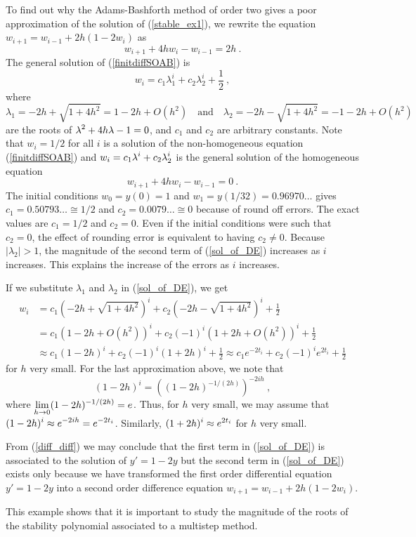 \begin{egg}
To find out why the Adams-Bashforth method of order two gives a poor
approximation of the solution of (\ref{stable_ex1}), we
rewrite the equation $w_{i+1} = w_{i-1} + 2h(1-2w_i)$ as
\begin{equation}\label{finitdiffSOAB}
  w_{i+1} + 4hw_i -w_{i-1} = 2h \ .
\end{equation}
The general solution of (\ref{finitdiffSOAB}) is
\begin{equation} \label{sol_of_DE}
w_i = c_1\lambda_1^i + c_2\lambda_2^i + \frac{1}{2} \ ,
\end{equation}
where
\[
\lambda_1 =-2h+\sqrt{1+4h^2} = 1-2h+O(h^2)
\quad \text{and} \quad 
\lambda_2 =-2h-\sqrt{1+4h^2} = -1-2h+O(h^2)
\]
are the roots of $\displaystyle \lambda^2 + 4h\lambda -1 =0$, and
$c_1$ and $c_2$ are arbitrary constants.  Note that $w_i= 1/2$ for all
$i$ is a solution of the non-homogeneous equation (\ref{finitdiffSOAB}) and
$\displaystyle w_i =c_1\lambda^i + c_2\lambda_2^i$ is the general solution of
the homogeneous equation
\[
  w_{i+1} + 4hw_i -w_{i-1} = 0 \ .
\]
The initial conditions $w_0=y(0)=1$ and $w_1=y(1/32) = 0.96970\ldots$
gives $c_1 = 0.50793\ldots \cong 1/2$ and $c_2 = 0.0079\ldots \cong 0$
because of round off errors.  The exact values are $c_1=1/2$
and $c_2=0$.  Even if the initial conditions were such that $c_2 =0$,
the effect of rounding error is equivalent to having $c_2 \neq 0$.
Because $|\lambda_2| >1$, the magnitude of the second term of
(\ref{sol_of_DE}) increases as $i$ increases.  This explains the
increase of the errors as $i$ increases.

If we substitute $\lambda_1$ and $\lambda_2$ in (\ref{sol_of_DE}),
we get
\begin{align}
w_i &= c_1 \left(-2h+\sqrt{1+4h^2} \right)^i
 + c_2 \left(-2h-\sqrt{1+4h^2} \right)^i + \frac{1}{2} \nonumber \\
&= c_1 \left(1-2h+O(h^2) \right)^i
 + c_2 (-1)^i \left(1+2h+O(h^2) \right)^i + \frac{1}{2} \nonumber \\
&\approx c_1 \left(1-2h \right)^i
 + c_2 (-1)^i \left(1+2h\right)^i + \frac{1}{2}
\approx c_1 e^{-2t_i} + c_2 (-1)^i e^{2t_i} + \frac{1}{2} \label{diff_diff}
\end{align}
for $h$ very small.  For the last approximation above, we note
that
\[
  (1-2h)^i = \left( (1-2h)^{-1/(2h)}\right)^{-2 i h} \ ,
\]
where $\displaystyle \lim_{h\to 0} (1-2h)^{-1/(2h)} = e$.  Thus, for
$h$ very small, we may assume that
$\displaystyle (1-2h)^i \approx e^{-2 i h} = e^{-2t_i}$.
Similarly, $\displaystyle (1+2h)^i \approx e^{2 t_i}$ for $h$ very small.

From (\ref{diff_diff}) we may conclude that the first term in
(\ref{sol_of_DE}) is associated to the solution of $y'=1-2y$ but the
second term in (\ref{sol_of_DE}) exists only because we have
transformed the first order differential equation $y'=1-2y$ into a
second order difference equation $w_{i+1} = w_{i-1} +2h(1-2w_i)$.

This example shows that it is important to study the magnitude of the
roots of the stability polynomial associated to a multistep method.
\label{Roundoff_effect}
\end{egg}


